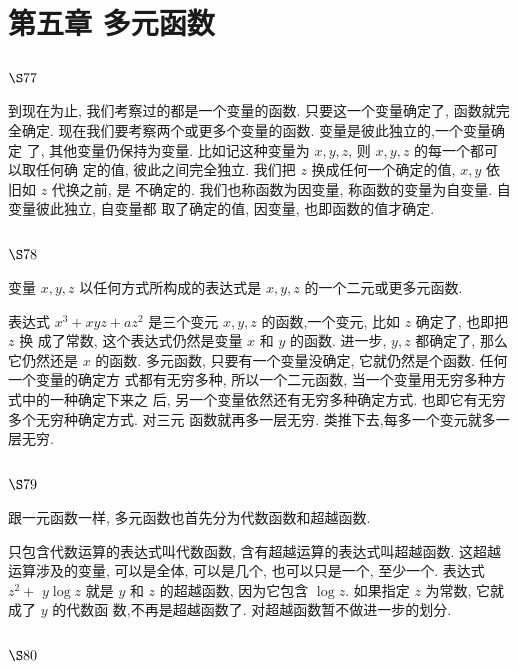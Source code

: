 \chapter{第五章 多元函数}

\section{$\S 77$}

到现在为止, 我们考察过的都是一个变量的函数. 只要这一个变量确定了, 函数就完 全确定. 现在我们要考察两个或更多个变量的函数. 变量是彼此独立的,一个变量确定 了, 其他变量仍保持为变量. 比如记这种变量为 $x, y, z$, 则 $x, y, z$ 的每一个都可以取任何确 定的值, 彼此之间完全独立. 我们把 $z$ 换成任何一个确定的值, $x, y$ 依旧如 $z$ 代换之前, 是 不确定的. 我们也称函数为因变量, 称函数的变量为自变量. 自变量彼此独立, 自变量都 取了确定的值, 因变量, 也即函数的值才确定.

\section{$\S 78$}

变量 $x, y, z$ 以任何方式所构成的表达式是 $x, y, z$ 的一个二元或更多元函数.

表达式 $x^{3}+x y z+a z^{2}$ 是三个变元 $x, y, z$ 的函数,一个变元, 比如 $z$ 确定了, 也即把 $z$ 换 成了常数, 这个表达式仍然是变量 $x$ 和 $y$ 的函数. 进一步, $y, z$ 都确定了, 那么它仍然还是 $x$ 的函数. 多元函数, 只要有一个变量没确定, 它就仍然是个函数. 任何一个变量的确定方 式都有无穷多种, 所以一个二元函数, 当一个变量用无穷多种方式中的一种确定下来之 后, 另一个变量依然还有无穷多种确定方式. 也即它有无穷多个无穷种确定方式. 对三元 函数就再多一层无穷. 类推下去,每多一个变元就多一层无穷.

\section{$\S 79$}

跟一元函数一样, 多元函数也首先分为代数函数和超越函数.

只包含代数运算的表达式叫代数函数, 含有超越运算的表达式叫超越函数. 这超越 运算涉及的变量, 可以是全体, 可以是几个, 也可以只是一个, 至少一个. 表达式 $z^{2}+$ $y \log z$ 就是 $y$ 和 $z$ 的超越函数, 因为它包含 $\log z$. 如果指定 $z$ 为常数, 它就成了 $y$ 的代数函 数,不再是超越函数了. 对超越函数暂不做进一步的划分. 

\section{$\S 80$}

